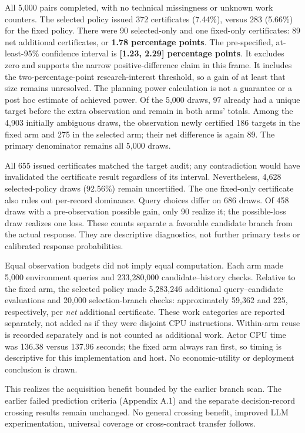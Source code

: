 

All 5,000 pairs completed, with no technical missingness or unknown work
counters. The selected policy issued 372 certificates (7.44\%), versus
283 (5.66\%) for the fixed policy. There were 90 selected-only and one
fixed-only certificates: 89 net additional certificates, or
\textbf{1.78 percentage points}. The pre-specified, at-least-95\%
confidence interval is \textbf{[1.23, 2.29] percentage points}.
It excludes zero and supports the narrow positive-difference claim
in this frame. It includes the two-percentage-point research-interest
threshold, so a gain of at least that size remains unresolved. The
planning power calculation is not a guarantee or a post hoc estimate
of achieved power. Of the 5,000 draws, 97 already had a unique target
before the extra observation and remain in both arms' totals. Among the
4,903 initially ambiguous draws, the observation newly certified 186
targets in the fixed arm and 275 in the selected arm; their net difference
is again 89. The primary denominator remains all 5,000 draws.

All 655 issued certificates matched the target audit; any contradiction
would have invalidated the certificate result regardless of its
interval. Nevertheless, 4,628 selected-policy draws (92.56\%) remain
uncertified. The one fixed-only certificate also rules out per-record
dominance. Query choices differ on 686 draws. Of 458 draws with a
pre-observation possible gain, only 90 realize it; the possible-loss
draw realizes one loss. These counts separate a favorable candidate
branch from the actual response. They are descriptive diagnostics,
not further primary tests or calibrated response probabilities.

Equal observation budgets did not imply equal computation. Each arm
made 5,000 environment queries and 233,280,000 candidate--history
checks. Relative to the fixed arm, the selected policy made 5,283,246
additional query--candidate evaluations and 20,000 selection-branch
checks: approximately 59,362 and 225, respectively, per \emph{net}
additional certificate. These work categories are reported separately,
not added as if they were disjoint CPU instructions. Within-arm reuse
is recorded separately and is not counted as additional work.
Actor CPU time was 136.38 versus 137.96 seconds; the fixed arm always
ran first, so timing is descriptive for this implementation and host.
No economic-utility or deployment conclusion is drawn.

This realizes the acquisition benefit bounded by the earlier branch scan.
The earlier failed prediction criteria (Appendix A.1) and the separate
decision-record crossing results remain unchanged.
No general crossing benefit, improved LLM experimentation, universal coverage
or cross-contract transfer follows.


